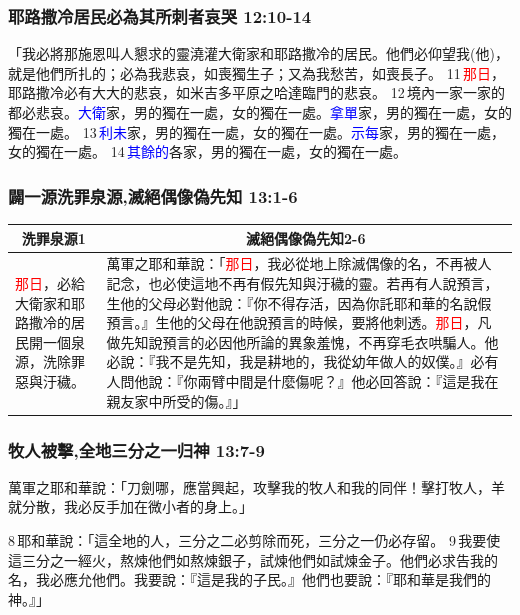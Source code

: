 \subsubsection{耶路撒冷居民必為其所刺者哀哭 12:10-14}
「我必將那施恩叫人懇求的靈澆灌大衛家和耶路撒冷的居民。他們必仰望我(他)，就是他們所扎的；必為我悲哀，如喪獨生子；又為我愁苦，如喪長子。 11 \textcolor{red}{那日}，耶路撒冷必有大大的悲哀，如米吉多平原之哈達臨門的悲哀。 12 境內一家一家的都必悲哀。\textcolor{blue}{大衛}家，男的獨在一處，女的獨在一處。\textcolor{blue}{拿單}家，男的獨在一處，女的獨在一處。 13 \textcolor{blue}{利未}家，男的獨在一處，女的獨在一處。\textcolor{blue}{示每}家，男的獨在一處，女的獨在一處。 14 \textcolor{blue}{其餘的}各家，男的獨在一處，女的獨在一處。


\subsubsection{闢一源洗罪泉源,滅絕偶像偽先知 13:1-6}
\begin{table}[H]
\centering
\begin{tabular}{p{2.25cm}|p{14.75cm}}\hline\hline
\multicolumn{1}{c|}{洗罪泉源1}&\multicolumn{1}{c}{滅絕偶像偽先知2-6}\\\hline
\textcolor{red}{那日}，必給大衛家和耶路撒冷的居民開一個泉源，洗除罪惡與汙穢。
&萬軍之耶和華說：「\textcolor{red}{那日}，我必從地上除滅偶像的名，不再被人記念，也必使這地不再有假先知與汙穢的靈。若再有人說預言，生他的父母必對他說：『你不得存活，因為你託耶和華的名說假預言。』生他的父母在他說預言的時候，要將他刺透。\textcolor{red}{那日}，凡做先知說預言的必因他所論的異象羞愧，不再穿毛衣哄騙人。他必說：『我不是先知，我是耕地的，我從幼年做人的奴僕。』必有人問他說：『你兩臂中間是什麼傷呢？』他必回答說：『這是我在親友家中所受的傷。』」\\\hline
\end{tabular}
\end{table}


\subsubsection{牧人被擊,全地三分之一归神 13:7-9}

萬軍之耶和華說：「刀劍哪，應當興起，攻擊我的牧人和我的同伴！擊打牧人，羊就分散，我必反手加在微小者的身上。」 

8 耶和華說：「這全地的人，三分之二必剪除而死，三分之一仍必存留。 9 我要使這三分之一經火，熬煉他們如熬煉銀子，試煉他們如試煉金子。他們必求告我的名，我必應允他們。我要說：『這是我的子民。』他們也要說：『耶和華是我們的神。』」

